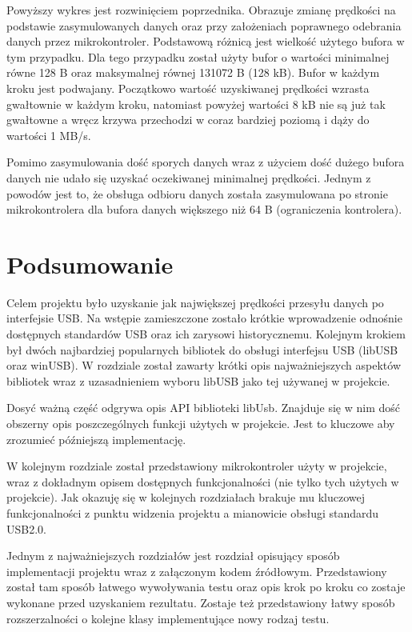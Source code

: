 \documentclass{BscUS}
\begin{document}
Powyższy wykres jest rozwinięciem poprzednika. Obrazuje zmianę prędkości na podstawie zasymulowanych danych oraz przy założeniach poprawnego odebrania danych przez mikrokontroler. Podstawową różnicą jest wielkość użytego bufora w tym przypadku. Dla tego przypadku został użyty bufor o wartości minimalnej równe 128 B oraz maksymalnej równej 131072 B (128 kB). Bufor w każdym kroku jest podwajany. Początkowo wartość uzyskiwanej prędkości wzrasta gwałtownie w każdym kroku, natomiast powyżej wartości 8 kB nie są już tak gwałtowne a wręcz krzywa przechodzi w coraz bardziej poziomą i dąży do wartości 1 MB/s. 
\newline

Pomimo zasymulowania dość sporych danych wraz z użyciem dość dużego bufora danych nie udało się uzyskać oczekiwanej minimalnej prędkości. Jednym z powodów jest to, że obsługa odbioru danych została zasymulowana po stronie mikrokontrolera dla bufora danych większego niż 64 B (ograniczenia kontrolera).


\chapter{Podsumowanie}
\label{ConclusionChapter}
Celem projektu było uzyskanie jak największej prędkości przesyłu danych po interfejsie USB. Na wstępie zamieszczone zostało krótkie wprowadzenie odnośnie dostępnych standardów USB oraz ich zarysowi historycznemu. Kolejnym krokiem był dwóch najbardziej popularnych bibliotek do obsługi interfejsu USB (libUSB oraz winUSB). W rozdziale został zawarty krótki opis najważniejszych aspektów bibliotek wraz z uzasadnieniem wyboru libUSB jako tej używanej w projekcie.

Dosyć ważną część odgrywa opis API biblioteki libUsb. Znajduje się w nim dość obszerny opis poszczególnych funkcji użytych w projekcie. Jest to kluczowe aby zrozumieć późniejszą implementację.

W kolejnym rozdziale został przedstawiony mikrokontroler użyty w projekcie, wraz z dokładnym opisem dostępnych funkcjonalności (nie tylko tych użytych w projekcie). Jak okazuję się w kolejnych rozdziałach brakuje mu kluczowej funkcjonalności z punktu widzenia projektu a mianowicie obsługi standardu USB2.0. \cite{landtigerDesc}

Jednym z najważniejszych rozdziałów jest rozdział opisujący sposób implementacji projektu wraz z załączonym kodem źródłowym. Przedstawiony został tam sposób łatwego wywoływania testu oraz opis krok po kroku co zostaje wykonane przed uzyskaniem rezultatu. Zostaje też przedstawiony łatwy sposób rozszerzalności o kolejne klasy implementujące nowy rodzaj testu.
\newline
\end{document}
